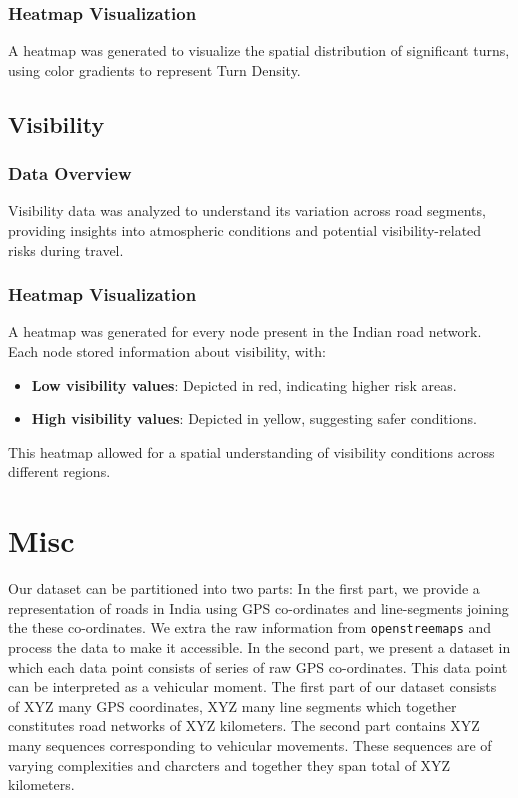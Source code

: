 \documentclass[sigplan,screen]{acmart}
\begin{document}
\subsubsection{Heatmap Visualization}
A heatmap was generated to visualize the spatial distribution of significant turns, using color gradients to represent Turn Density.

\subsection{Visibility}
\subsubsection{Data Overview}
Visibility data was analyzed to understand its variation across road segments, providing insights into atmospheric conditions and potential visibility-related risks during travel.

\subsubsection{Heatmap Visualization}
A heatmap was generated for every node present in the Indian road network. Each node stored information about visibility, with:
\begin{itemize}
    \item \textbf{Low visibility values}: Depicted in red, indicating higher risk areas.
    \item \textbf{High visibility values}: Depicted in yellow, suggesting safer conditions.
\end{itemize}
This heatmap allowed for a spatial understanding of visibility conditions across different regions.


\section{Misc}

Our dataset can be partitioned into two parts:
In the first part, we provide a representation of roads in India
using GPS co-ordinates and line-segments joining the 
these co-ordinates.
We extra the raw information from \texttt{openstreemaps}
and process the data to make it accessible.
In the second part, we present a dataset 
in which each data point consists of series 
of raw GPS co-ordinates.
This data point can be interpreted as a vehicular moment. 
The first part of our dataset consists of XYZ many GPS coordinates,
XYZ many line segments which together constitutes road networks
of XYZ kilometers.
The second part contains XYZ many sequences corresponding
to vehicular movements.
These sequences are of varying complexities and charcters
and together they span total of XYZ kilometers. 
\end{document}
